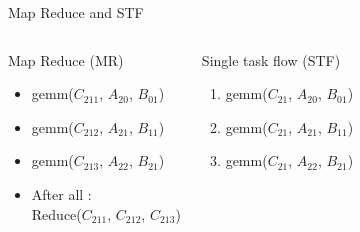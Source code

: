 \documentclass[tikz,presentation,border=10pt]{beamer}
\begin{document}
\begin{frame}{Map Reduce and STF}
\begin{columns}




            \begin{block}{Map Reduce (MR)}
                \begin{itemize}
                    \item \color{red} gemm($C_{211}$, $A_{20}$, $B_{01}$)
                    \item \color{fancyViolet} gemm($C_{212}$, $A_{21}$, $B_{11}$)
                    \item \color{orange} gemm($C_{213}$, $A_{22}$, $B_{21}$)
                    \item \color{black} After all : \\ Reduce($C_{211}$, $C_{212}$, $C_{213}$)
                \end{itemize}
            \end{block}
            \begin{exampleblock}{Single task flow (STF)}
                \begin{enumerate}
                    \item \color{red} gemm($C_{21}$, $A_{20}$, $B_{01}$)
                    \item \color{fancyViolet} gemm($C_{21}$, $A_{21}$, $B_{11}$)
                    \item \color{orange} gemm($C_{21}$, $A_{22}$, $B_{21}$)
                \end{enumerate}
            \end{exampleblock}
    \end{columns}
    
\end{frame}
\end{document}
